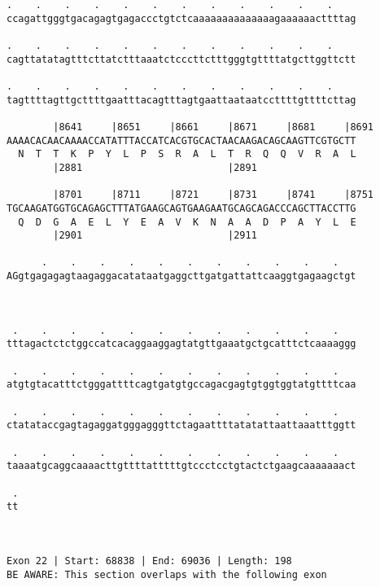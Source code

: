 \documentclass{article}
\begin{document}
\begin{Verbatim}
.    .    .    .    .    .    .    .    .    .    .    .    
ccagattgggtgacagagtgagaccctgtctcaaaaaaaaaaaaaagaaaaaacttttag
                                                            
.    .    .    .    .    .    .    .    .    .    .    .    
cagttatatagtttcttatctttaaatctcccttctttgggtgttttatgcttggttctt
                                                            
.    .    .    .    .    .    .    .    .    .    .    .    
tagttttagttgcttttgaatttacagtttagtgaattaataatccttttgttttcttag
                                                            
        |8641     |8651     |8661     |8671     |8681     |8691
AAAACACAACAAAACCATATTTACCATCACGTGCACTAACAAGACAGCAAGTTCGTGCTT
  N  T  T  K  P  Y  L  P  S  R  A  L  T  R  Q  Q  V  R  A  L
        |2881                         |2891                 
  
        |8701     |8711     |8721     |8731     |8741     |8751
TGCAAGATGGTGCAGAGCTTTATGAAGCAGTGAAGAATGCAGCAGACCCAGCTTACCTTG
  Q  D  G  A  E  L  Y  E  A  V  K  N  A  A  D  P  A  Y  L  E
        |2901                         |2911                 
  
      .    .    .    .    .    .    .    .    .    .    .   
AGgtgagagagtaagaggacatataatgaggcttgatgattattcaaggtgagaagctgt
                                                            
                                                            
  
 .    .    .    .    .    .    .    .    .    .    .    .   
tttagactctctggccatcacaggaaggagtatgttgaaatgctgcatttctcaaaaggg
                                                            
 .    .    .    .    .    .    .    .    .    .    .    .   
atgtgtacatttctgggattttcagtgatgtgccagacgagtgtggtggtatgttttcaa
                                                            
 .    .    .    .    .    .    .    .    .    .    .    .   
ctatataccgagtagaggatgggagggttctagaattttatatattaattaaatttggtt
                                                            
 .    .    .    .    .    .    .    .    .    .    .    .   
taaaatgcaggcaaaacttgttttatttttgtccctcctgtactctgaagcaaaaaaact
                                                            
 .
tt
  
  
 
Exon 22 | Start: 68838 | End: 69036 | Length: 198
BE AWARE: This section overlaps with the following exon




\end{Verbatim}
\end{document}
